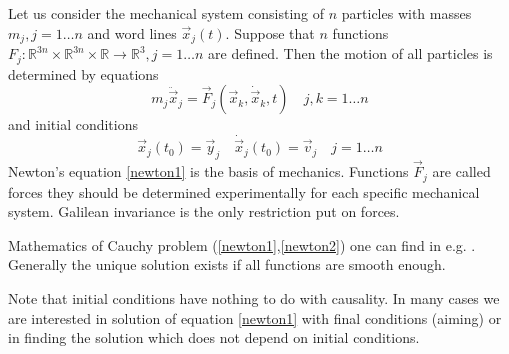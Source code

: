 \documentclass[11pt]{book}
\begin{document}
Let us consider the mechanical system consisting of $n$ particles 
with masses $m_j,j=1\ldots n$ and word lines $\vec x_j(t)$.
Suppose that $n$ functions  
$F_j:\mathbb{R}^{3 n}\times\mathbb{R}^{3 n}\times\mathbb{R}\rightarrow\mathbb{R}^3,j=1\ldots n$ 
are defined. Then the motion of all particles is determined by equations
\begin{equation}
    m_j \ddot \vec x_j=\vec F_j(\vec x_k,\dot \vec x_k,t) \quad j,k=1\ldots n \label {newton1}
\end{equation}
and initial conditions
\begin{equation}
    \vec x_j(t_0)=\vec y_j\quad\dot \vec x_j(t_0)=\vec v_j  \quad j=1\ldots n \label {newton2}
\end{equation}
Newton's equation \eqref{newton1} is  the basis of mechanics. Functions $\vec F_j$
are called forces they should be determined experimentally for each specific mechanical system.
Galilean invariance is the only restriction put on forces.

Mathematics of  Cauchy problem (\ref{newton1},\ref{newton2}) 
one can find in e.g. \cite{arnold-ode}. Generally the unique solution exists if
all functions are smooth enough.

Note that initial conditions have nothing to do with causality. In many cases we are
interested in solution of equation \eqref{newton1} with final 
conditions (aiming) or in finding the solution which does not 
depend on initial conditions.




\printbibliography[
heading=bibintoc,
title={References}
] 
\clearpage
\end{document}
